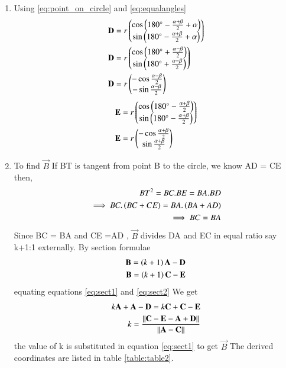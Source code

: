 \begin{enumerate}[label=\thesection.\arabic*.,ref=\thesection.\theenumi]
\item Using \ref{eq:point_on_circle} and \ref{eq:equalangles}
\begin{align}
\mathbf{D} &= r\begin{pmatrix}\cos \left(180^{\circ}-\frac{\alpha+\beta}{2}+\alpha\right) \\ \sin \left(180^{\circ}-\frac{\alpha+\beta}{2}+\alpha\right)\end{pmatrix} 
\\
\mathbf{D} &= r\begin{pmatrix}\cos \left(180^{\circ}+\frac{\alpha-\beta}{2}\right) \\ \sin \left(180^{\circ}+\frac{\alpha-\beta}{2}\right)\end{pmatrix}
\\
\mathbf{D} &= r\begin{pmatrix}-\cos \frac{\alpha-\beta}{2} \\ -\sin \frac{\alpha-\beta}{2}\end{pmatrix}
\label{eq:constr_d}
\end{align}
\begin{align}
\mathbf{E} &= r\begin{pmatrix}\cos \left(180^{\circ}-\frac{\alpha+\beta}{2}\right) \\ \sin \left(180^{\circ}-\frac{\alpha+\beta}{2}\right)\end{pmatrix}
\\
\mathbf{E} &= r\begin{pmatrix}-\cos \frac{\alpha+\beta}{2} \\ \sin \frac{\alpha+\beta}{2}\end{pmatrix}
\end{align}
\item To find $\vec{B}$
\newline
If BT is tangent from point B to the circle, we know AD = CE then,
\begin{align}
BT^{2}=BC.BE = BA.BD
\\
\implies BC.\left(BC+CE\right) = BA.\left(BA+AD\right)
\\
\implies BC = BA
\end{align} 
Since BC = BA and CE =AD , $\vec{B}$ divides DA and EC in equal ratio say k+1:1 externally.
By section formulae
\begin{align}
\label{eq:sect1}
\mathbf{B}= \left(k+1\right)\mathbf{A}-\mathbf{D}
\\
\mathbf{B}= \left(k+1\right)\mathbf{C}-\mathbf{E}
\label{eq:sect2}
\end{align}
equating equations \ref{eq:sect1} and \ref{eq:sect2} We get
\begin{align}
k\mathbf{A}+\mathbf{A}-\mathbf{D}=k\mathbf{C}+\mathbf{C}-\mathbf{E}
\\
k=\frac{\left\lVert\mathbf{C}-\mathbf{E}-\mathbf{A}+\mathbf{D}\right\rVert}{\left\lVert\mathbf{A}-\mathbf{C}\right\rVert}
\end{align}
the value of k is substituted in equation \ref{eq:sect1} to get $\vec{B}$
\newline
The derived coordinates are listed in table \ref{table:table2}. 
%
\begin{table}[ht!]
\centering

\end{table}
\end{enumerate}
